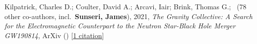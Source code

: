 \item Kilpatrick, Charles D.; Coulter, David A.; Arcavi, Iair; Brink, Thomas G.; \etal\ ({78} other co-authors, incl.\ \textbf{Sunseri, James}), 2021, \emph{The Gravity Collective: A Search for the Electromagnetic Counterpart to the Neutron Star-Black Hole Merger GW190814}, ArXiv () [\href{https://ui.adsabs.harvard.edu/abs/2021arXiv210606897K}{1 citation}]